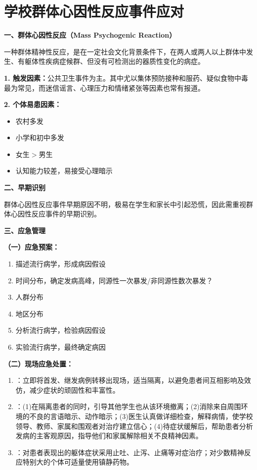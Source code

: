 \section{学校群体心因性反应事件应对}

\begin{keybox}
\textbf{一、群体心因性反应（Mass Psychogenic Reaction）}

一种群体精神性反应，是在一定社会文化背景条件下，在两人或两人以上群体中发生、有躯体性疾病症候群、但没有可检测出的器质性变化的病症。

\textbf{1. 触发因素：}公共卫生事件为主。其中尤以集体预防接种和服药、疑似食物中毒最为常见，而迷信谣言、心理压力和情绪紧张等因素也常有报道。

\textbf{2. 个体易患因素：}
\begin{itemize}[leftmargin=*]
    \item 农村多发
    \item 小学和初中多发
    \item 女生$>$男生
    \item 认知能力较差，易接受心理暗示
\end{itemize}

\textbf{二、早期识别}

群体心因性反应事件早期原因不明，极易在学生和家长中引起恐慌，因此需重视群体心因性反应事件的早期识别。

\textbf{三、应急管理}

\textbf{（一）应急预案：}
\begin{enumerate}[leftmargin=*]
    \item 描述流行病学，形成病因假设
    \item 时间分布，确定发病高峰，同源性一次暴发/非同源性数次暴发？
    \item 人群分布
    \item 地区分布
    \item 分析流行病学，检验病因假设
    \item 实验流行病学，最终确定病因
\end{enumerate}

\textbf{（二）现场应急处置：}
\begin{enumerate}[leftmargin=*]
    \item {}：立即将首发、继发病例转移出现场，适当隔离，以避免患者间互相影响及效仿，减少症状的顽固性和丰富性。
    \item {}：(1)在隔离患者的同时，引导其他学生也从该环境撤离；(2)消除来自周围环境的不良的言语暗示、动作暗示；(3)医生认真做详细检查，解释病情，使学校领导、教师、家属和围观者对治疗建立信心；(4)待症状缓解后，帮助患者分析发病的主客观原因，指导他们和家属解除相关不良精神因素。
    \item {}：对患者表现出的躯体症状采用止吐、止泻、止痛等对症治疗；对少数精神反应特别大的个体可适量使用镇静药物。
\end{enumerate}


\end{keybox}
